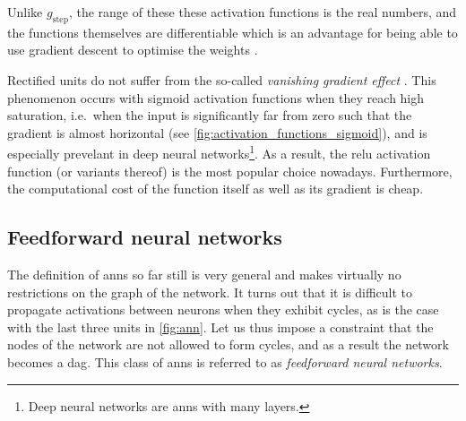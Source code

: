 \documentclass[../report.tex]{subfiles}
\begin{document}
Unlike $g_\text{step}$, the range of these these activation functions is the real numbers, and the functions themselves are differentiable which is an advantage for being able to use gradient descent to optimise the weights \cite[729]{russell2010}.

Rectified units do not suffer from the so-called \emph{vanishing gradient effect} \cite{glorot2011}.
This phenomenon occurs with sigmoid activation functions when they reach high saturation, i.e.\ when the input is significantly far from zero such that the gradient is almost horizontal (see \cref{fig:activation_functions_sigmoid}), and is especially prevelant in deep neural networks\footnote{Deep neural networks are \glspl{ann} with many layers.}.
As a result, the \gls{relu} activation function (or variants thereof) is the most popular choice nowadays.
Furthermore, the computational cost of the function itself as well as its gradient is cheap.

\subsection{Feedforward neural networks}
The definition of \glspl{ann} so far still is very general and makes virtually no restrictions on the graph of the network.
It turns out that it is difficult to propagate activations between neurons when they exhibit cycles, as is the case with the last three units in \cref{fig:ann}.
Let us thus impose a constraint that the nodes of the network are not allowed to form cycles, and as a result the network becomes a \gls{dag}.
This class of \glspl{ann} is referred to as \emph{feedforward neural networks}.
\end{document}
